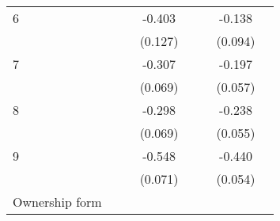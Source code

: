 \begin{longtable}{l*{3}{c}|l*{3}{c}}
		6                   &                     &                     &      -0.403\sym{**} &                     &                     &      -0.138         \\
		&                     &                     &     (0.127)         &                     &                     &     (0.094)         \\
		7                   &                     &                     &      -0.307\sym{***}&                     &                     &      -0.197\sym{***}\\
		&                     &                     &     (0.069)         &                     &                     &     (0.057)         \\
		8                   &                     &                     &      -0.298\sym{***}&                     &                     &      -0.238\sym{***}\\
		&                     &                     &     (0.069)         &                     &                     &     (0.055)         \\
		9                   &                     &                     &      -0.548\sym{***}&                     &                     &      -0.440\sym{***}\\
		&                     &                     &     (0.071)         &                     &                     &     (0.054)         \\
		Ownership form &&&&&\\


\end{longtable}
